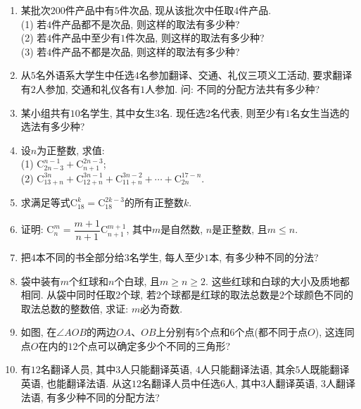 \documentclass[10pt,a4paper]{article}
\begin{document}
\begin{enumerate}[1.]
\item 某批次$200$件产品中有$5$件次品, 现从该批次中任取$4$件产品.\\
(1) 若$4$件产品都不是次品, 则这样的取法有多少种?\\
(2) 若$4$件产品中至少有$1$件次品, 则这样的取法有多少种?\\
(3) 若$4$件产品不都是次品, 则这样的取法有多少种? 
\item 从$5$名外语系大学生中任选$4$名参加翻译、交通、礼仪三项义工活动, 要求翻译有$2$人参加, 交通和礼仪各有$1$人参加. 问: 不同的分配方法共有多少种? 
\item 某小组共有$10$名学生, 其中女生$3$名. 现任选$2$名代表, 则至少有$1$名女生当选的选法有多少种? 
\item 设$n$为正整数, 求值:\\
(1) $\mathrm{C}_{2n-3}^{n-1}+\mathrm{C}_{n+1}^{2n-3}$;\\
(2) $\mathrm{C}_{13+n}^{3n}+\mathrm{C}_{12+n}^{3n-1}+\mathrm{C}_{11+n}^{3n-2}+\cdots+\mathrm{C}_{2n}^{17-n}$.
\item 求满足等式$\mathrm{C}_{18}^k=\mathrm{C}_{18}^{2k-3}$的所有正整数$k$.
\item 证明: $\mathrm{C}_n^m=\dfrac{m+1}{n+1}\mathrm{C}_{n+1}^{m+1}$, 其中$m$是自然数, $n$是正整数, 且$m\le n$.
\item 把$4$本不同的书全部分给$3$名学生, 每人至少$1$本, 有多少种不同的分法? 
\item 袋中装有$m$个红球和$n$个白球, 且$m\ge n\ge 2$. 这些红球和白球的大小及质地都相同. 从袋中同时任取$2$个球, 若$2$个球都是红球的取法总数是$2$个球颜色不同的取法总数的整数倍, 求证: $m$必为奇数.
\item 如图, 在$\angle AOB$的两边$OA$、$OB$上分别有$5$个点和$6$个点(都不同于点$O$), 这连同点$O$在内的$12$个点可以确定多少个不同的三角形? 
\begin{center}
\end{center}
\item 有$12$名翻译人员, 其中$3$人只能翻译英语, $4$人只能翻译法语, 其余$5$人既能翻译英语, 也能翻译法语. 从这$12$名翻译人员中任选$6$人, 其中$3$人翻译英语, $3$人翻译法语, 有多少种不同的分配方法? 

\end{enumerate}
\end{document}
